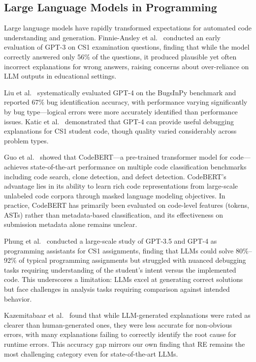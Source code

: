 \documentclass[10pt,a4paper]{article}
\begin{document}
\subsection{Large Language Models in Programming}

Large language models have rapidly transformed expectations for automated code
understanding and generation. Finnie-Ansley et
al.~\cite{finnie2022robots}
conducted an early evaluation of GPT-3 on CS1 examination questions, finding
that while the model correctly answered only 56\% of the questions, it
produced plausible yet often incorrect explanations for wrong answers,
raising concerns about over-reliance on LLM outputs in educational settings.

Liu et al.~\cite{huang2025template} systematically evaluated GPT-4 on the
BugsInPy benchmark and reported 67\% bug identification accuracy, with
performance varying significantly by bug type---logical errors were more
accurately identified than performance issues. Katic
et al.~\cite{raihan2025large} demonstrated that GPT-4 can provide useful
debugging explanations for CS1 student code, though quality varied
considerably across problem types.

Guo et al.~\cite{feng2020codebert} showed that CodeBERT---a pre-trained
transformer model for code---achieves state-of-the-art performance on multiple
code classification benchmarks including code search, clone detection, and
defect detection. CodeBERT's advantage lies in its ability to learn rich code
representations from large-scale unlabeled code corpora through masked
language modeling objectives. In practice, CodeBERT has primarily been evaluated
on code-level features (tokens, ASTs) rather than metadata-based
classification, and its effectiveness on submission metadata alone remains
unclear.

Phung et al.~\cite{zamfirescu2023what} conducted a large-scale
study of GPT-3.5 and GPT-4 as programming assistants for CS1 assignments,
finding that LLMs could solve 80\%--92\% of typical programming assignments
but struggled with nuanced debugging tasks requiring understanding of the
student's intent versus the implemented code. This underscores a
limitation: LLMs excel at generating correct solutions but face challenges in
analysis tasks requiring comparison against intended behavior.

Kazemitabaar et al.~\cite{kazemitabaar2024impact} found that while
LLM-generated explanations were rated as clearer than human-generated ones,
they were less accurate for non-obvious errors, with many explanations failing
to correctly identify the root cause for runtime errors. This accuracy gap
mirrors our own finding that RE remains the most challenging category even for
state-of-the-art LLMs.
\end{document}
